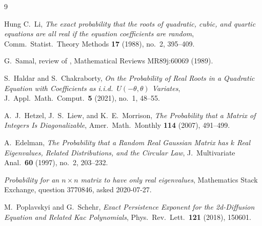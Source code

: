 \documentclass[11pt,reqno]{amsart}
\theoremstyle{plain}
\theoremstyle{remark}
\begin{document}
\begin{thebibliography}{9}

Hung C.~Li, \emph{The exact probability that the roots of quadratic, cubic,
and quartic equations are all real if the equation coefficients are random},
Comm.\ Statist.\ Theory Methods \textbf{17} (1988), no.~2, 395--409.

G.~Samal, review of \cite{li1988}, Mathematical Reviews MR89j:60069 (1989).

S.~Haldar and S.~Chakraborty, \emph{On the Probability of Real Roots in a
Quadratic Equation with Coefficients as i.i.d.\ $U(-\theta,\theta)$
Variates}, J.\ Appl.\ Math.\ Comput.\ \textbf{5} (2021), no.~1, 48--55.

A.~J.~Hetzel, J.~S.~Liew, and K.~E.~Morrison, \emph{The Probability that a
Matrix of Integers Is Diagonalizable}, Amer.\ Math.\ Monthly \textbf{114}
(2007), 491--499.

A.~Edelman, \emph{The Probability that a Random Real Gaussian Matrix has $k$
Real Eigenvalues, Related Distributions, and the Circular Law}, J.\
Multivariate Anal.\ \textbf{60} (1997), no.~2, 203--232.

\emph{Probability for an $n\times n$ matrix to have only real eigenvalues},
Mathematics Stack Exchange, question 3770846, asked 2020-07-27.

M.~Poplavskyi and G.~Schehr, \emph{Exact Persistence Exponent for the
2d-Diffusion Equation and Related Kac Polynomials}, Phys.\ Rev.\ Lett.\
\textbf{121} (2018), 150601.

\end{thebibliography}
\end{document}
